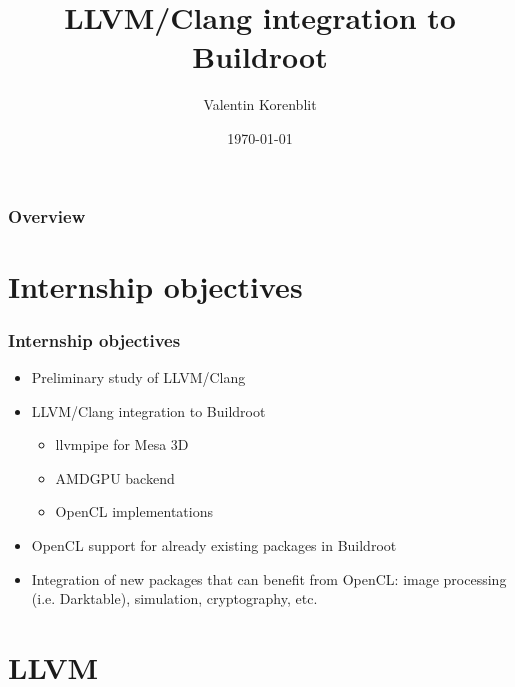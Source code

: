 \documentclass{beamer}
\title[]{LLVM/Clang integration to Buildroot}
\author{Valentin Korenblit}
\institute[Smile]
{
Smile \\~\\
\medskip
\textit{valentin.korenblit@smile.fr}
}
\date{\today}
\begin{document}
\begin{frame}
\titlepage
\end{frame}

\begin{frame}
\frametitle{Overview}
\tableofcontents
\end{frame}

\section{Internship objectives}

\begin{frame}
\frametitle{Internship objectives}
\begin{itemize}
  \item Preliminary study of LLVM/Clang
  \item LLVM/Clang integration to Buildroot
  \begin{itemize}
    \item llvmpipe for Mesa 3D
    \item AMDGPU backend
    \item OpenCL implementations
  \end{itemize}
  \item OpenCL support for already existing packages in Buildroot
  \item Integration of new packages that can benefit from OpenCL:
  image processing (i.e. Darktable), simulation, cryptography, etc.
\end{itemize}
\end{frame}
\section{LLVM}
\end{document}
